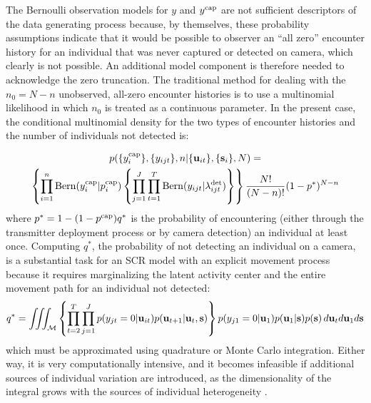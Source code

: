 \documentclass[12pt]{article}
\newcommand{\bs}{{\bf s}}
\newcommand{\bsi}{{\bf s}_i}
\newcommand{\bu}{{\bf u}}
\newcommand{\but}{{\bf u}_{t}}
\newcommand{\buit}{{\bf u}_{it}}
\begin{document}
The Bernoulli observation models for $y$ and $y^{\rm cap}$
are not sufficient descriptors of the data generating process because,
by themselves, these probability assumptions indicate that it would be
possible to observer an ``all zero'' encounter history for an
individual that was never captured or detected on camera, which
clearly is not possible. An additional model component is therefore
needed to acknowledge the zero truncation. The traditional method for
dealing with the $n_0=N-n$ unobserved, all-zero encounter histories is
to use a multinomial likelihood in which %
$n_0$ is treated as a continuous parameter. In the present case,
the conditional multinomial density for the two types of encounter
histories and the number of individuals not detected is: 

\begin{multline}
  p(\{ y_i^{\rm cap}\},\{ y_{ijt}\},n|\{\bu_{it}\}, \{\bs_i\}, N) = \\
  \left\{
  \prod_{i=1}^n
    \mathrm{Bern}(y_i^{\rm cap}|p^{\rm cap}_i) \left\{\prod_{j=1}^J\prod_{t=1}^T
  \mathrm{Bern}(y_{ijt}|\lambda^{\rm det}_{ijt}) \right\}\right\} \frac{N!}{(N-n)!} (1-p^*)^{N-n}
  \label{eq:multinom}
\end{multline}
where $p^*=1-(1-p^{\rm cap})q^*$ is the probability of encountering (either through the
transmitter deployment process or by camera detection) an individual
at least once. Computing $q^*$, the probability of not detecting an
individual on a camera, is a substantial task for an SCR model
with an explicit movement process because it requires marginalizing
the latent activity center and the entire movement path for an
individual not detected:
\begin{equation}
  q^* = \iiint_{\mathcal{M}} \left\{\prod_{t=2}^T \prod_{j=1}^J
    p(y_{jt}=0|\buit)p(\bu_{t+1}|\bu_{t},\bs)\right\}p(y_{j1}=0|\bu_{1})p(\bu_1|\bs)p(\bs)
  \, d\but d\bu_1 d\bs
  \label{eq:q-star}
\end{equation}
which must be approximated using quadrature or Monte Carlo
integration. Either way, it is very computationally intensive, and it
becomes infeasible if additional sources of individual variation are
introduced, as the dimensionality of the integral grows with
the sources of individual heterogeneity \citep{king_etal:2016}. 
\end{document}
